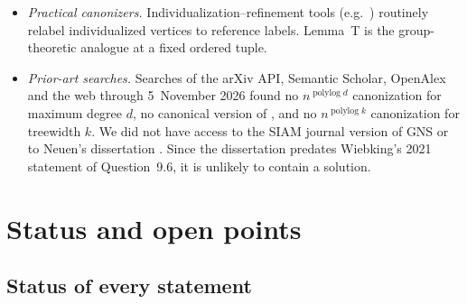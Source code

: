\documentclass[11pt]{article}
\theoremstyle{plain}
\theoremstyle{definition}
\theoremstyle{remark}
\theoremstyle{named}
\theoremstyle{namedrm}
\newcommand{\polylog}{\operatorname{polylog}}
\begin{document}
\begin{itemize}
  \cite{Neu24genus}.
\item \emph{Practical canonizers.} Individualization--refinement tools (e.g.\ \cite{MP14}) routinely relabel
  individualized vertices to reference labels. Lemma~T is the group-theoretic analogue at a fixed ordered
  tuple.
\item \emph{Prior-art searches.} Searches of the arXiv API, Semantic Scholar, OpenAlex and the web through
  5~November 2026 found no $n^{\polylog d}$ canonization for maximum degree $d$, no canonical version of
  \cite{Neu20}, and no $n^{\polylog k}$ canonization for treewidth $k$. We did not have access to the SIAM
  journal version of GNS or to Neuen's dissertation \cite{Neu19}. Since the dissertation predates Wiebking's
  2021 statement of Question~9.6, it is unlikely to contain a solution.
\end{itemize}

\section{Status and open points}\label{sec:statusopen}

\subsection{Status of every statement}
\end{document}
